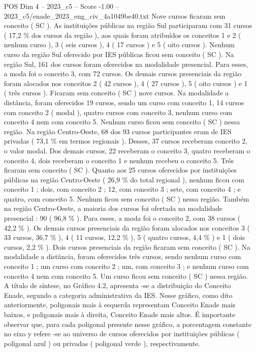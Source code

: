 \begin{textsample}{POS Dim 4 – 2023\_c5 – Score -1.00 – 2023\_c5/enade\_2023\_eng\_civ\_4a1049be40.txt}
Nove cursos ficaram sem conceito ( SC ).
As instituições públicas na região Sul participaram com 31 cursos ( 17,2 \% dos cursos da região ), aos quais foram atribuídos os conceitos 1 e 2 ( nenhum curso ), 3 ( seis cursos ), 4 ( 17 cursos ) e 5 ( oito cursos ).
Nenhum curso da região Sul oferecido por IES públicas ficou sem conceito ( SC ).
Na região Sul, 161 dos cursos foram oferecidos na modalidade presencial.
Para esses, a moda foi o conceito 3, com 72 cursos.
Os demais cursos presenciais da região foram alocados nos conceitos 2 ( 42 cursos ), 4 ( 27 cursos ), 5 ( oito cursos ) e 1 ( três cursos ).
Ficaram sem conceito ( SC ) nove cursos.
Na modalidade a distância, foram oferecidos 19 cursos, sendo um curso com conceito 1, 14 cursos com conceito 2 ( modal ), quatro cursos com conceito 3, nenhum curso com conceito 4 nem com conceito 5.
Nenhum curso ficou sem conceito ( SC ) nessa região.
Na região Centro-Oeste, 68 dos 93 cursos participantes eram de IES privadas ( 73,1 \% em termos regionais ).
Desses, 37 cursos receberam conceito 2, o valor modal.
Dos demais cursos, 22 receberam o conceito 3, quatro receberam o conceito 4, dois receberam o conceito 1 e nenhum recebeu o conceito 5.
Três ficaram sem conceito ( SC ).
Quanto aos 25 cursos oferecidos por instituições públicas na região Centro-Oeste ( 26,9 \% do total regional ), nenhum ficou com conceito 1 ; dois, com conceito 2 ; 12, com conceito 3 ; sete, com conceito 4 ; e quatro, com conceito 5.
Nenhum ficou sem conceito ( SC ) nessa região.
Também na região Centro-Oeste, a maioria dos cursos foi ofertada na modalidade presencial : 90 ( 96,8 \% ).
Para esses, a moda foi o conceito 2, com 38 cursos ( 42,2 \% ).
Os demais cursos presenciais da região foram alocados nos conceitos 3 ( 33 cursos, 36,7 \% ), 4 ( 11 cursos, 12,2 \% ), 5 ( quatro cursos, 4,4 \% ) e 1 ( dois cursos, 2,2 \% ).
Dois cursos presenciais da região ficaram sem conceito ( SC ).
Na modalidade a distância, foram oferecidos três cursos, sendo nenhum curso com conceito 1 ; um curso com conceito 2 ; um, com conceito 3 ; e nenhum curso com conceito 4 nem com conceito 5.
Um curso ficou sem conceito ( SC ) nessa região.
A título de síntese, no Gráfico 4.2, apresenta -se a distribuição do Conceito Enade, segundo a categoria administrativa da IES.
Nesse gráfico, como dito anteriormente, poligonais mais à esquerda representam Conceito Enade mais baixos, e poligonais mais à direita, Conceito Enade mais altos.
É importante observar que, para cada poligonal presente nesse gráfico, a porcentagem constante no eixo y refere -se ao universo de cursos oferecidos por instituições públicas ( poligonal azul ) ou privadas ( poligonal verde ), respectivamente.

\end{textsample}

